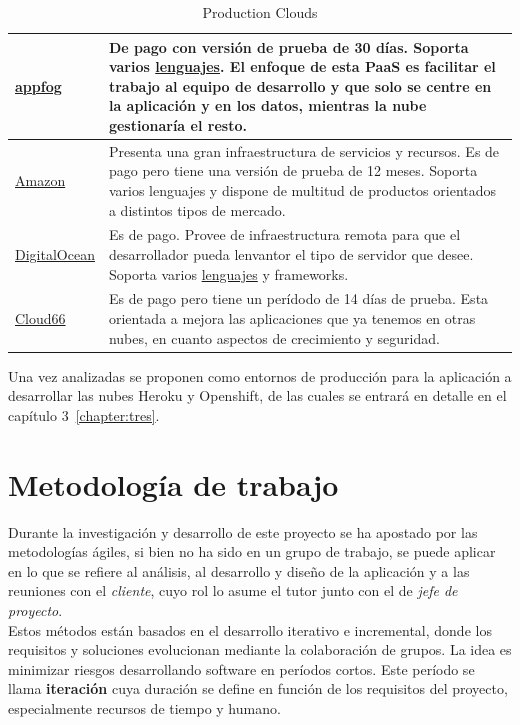 \begin{table}
\begin{tabular}{p{3cm} p{8cm}}
	\hline
	\href{https://www.appfog.com/}{appfog} & De pago con versión de prueba de 30 días. Soporta varios \href{https://www.ctl.io/appfog/}{lenguajes}. El enfoque de esta PaaS es facilitar el trabajo al equipo de desarrollo y que solo se centre en la aplicación y en los datos, mientras la nube gestionaría el resto. \\
	\hline
	\href{https://aws.amazon.com/es/?nc2=h_lg}{Amazon} & Presenta una gran infraestructura de servicios y recursos. Es de pago pero tiene una versión de prueba de 12 meses. Soporta varios lenguajes y dispone de multitud de productos orientados a distintos tipos de mercado. \\
	\hline
	\href{https://www.digitalocean.com/}{DigitalOcean} & Es de pago. Provee de infraestructura remota para que el desarrollador pueda lenvantor el tipo de servidor que desee. Soporta varios \href{https://www.digitalocean.com/community/}{lenguajes} y frameworks. \\
	\hline
	\href{http://www.cloud66.com/}{Cloud66} & Es de pago pero tiene un perídodo de 14 días de prueba. Esta orientada a mejora las aplicaciones que ya tenemos en otras nubes, en cuanto aspectos de crecimiento y seguridad. \\
	\hline
	\end{tabular}
	\caption{Production Clouds}
	\label{tabla:clouds}
\end{table}

Una vez analizadas se proponen como entornos de producción para la aplicación a desarrollar las nubes Heroku y Openshift, de las cuales se entrará en detalle en el {capítulo 3}~\ref{chapter:tres}.



\vspace*{0.2in}
\section{Metodología de trabajo}\label{cap.1.3}

\vspace*{0.1in}
Durante la investigación y desarrollo de este proyecto se ha apostado por las metodologías ágiles, si bien no ha sido en un grupo de trabajo, se puede aplicar en lo que se refiere al análisis, al desarrollo y diseño de la aplicación y a las reuniones con el \emph{cliente}, cuyo rol lo asume el tutor junto con el de \emph{jefe de proyecto}. \\

Estos métodos están basados en el desarrollo iterativo e incremental, donde los requisitos y soluciones evolucionan mediante la colaboración de grupos. La idea es minimizar riesgos desarrollando software en períodos cortos. Este período se llama \textbf{iteración} cuya duración se define en función de los requisitos del proyecto, especialmente recursos de tiempo y humano. \\

